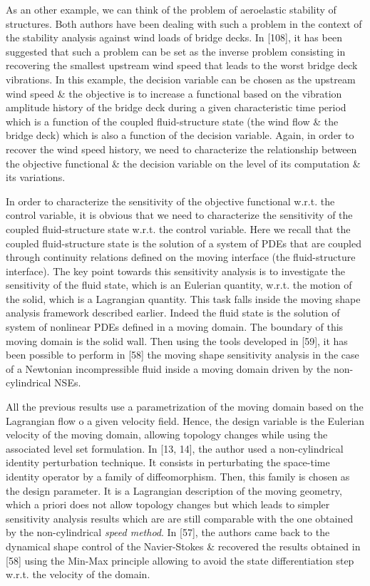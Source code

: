 \documentclass[oneside]{book}
\numberwithin{equation}{section}
\begin{document}
As an other example, we can think of the problem of aeroelastic stability of structures. Both authors have been dealing with such a problem in the context of the stability analysis against wind loads of bridge decks. In [108], it has been suggested that such a problem can be set as the inverse problem consisting in recovering the smallest upstream wind speed that leads to the worst bridge deck vibrations. In this example, the decision variable can be chosen as the upstream wind speed \& the objective is to increase a functional based on the vibration amplitude history of the bridge deck during a given characteristic time period which is a function of the coupled fluid-structure state (the wind flow \& the bridge deck) which is also a function of the decision variable. Again, in order to recover the wind speed history, we need to characterize the relationship between the objective functional \& the decision variable on the level of its computation \& its variations.

In order to characterize the sensitivity of the objective functional w.r.t. the control variable, it is obvious that we need to characterize the sensitivity of the coupled fluid-structure state w.r.t. the control variable. Here we recall that the coupled fluid-structure state is the solution of a system of PDEs that are coupled through continuity relations defined on the moving interface (the fluid-structure interface). The key point towards this sensitivity analysis is to investigate the sensitivity of the fluid state, which is an Eulerian quantity, w.r.t. the motion of the solid, which is a Lagrangian quantity. This task falls inside the moving shape analysis framework described earlier. Indeed the fluid state is the solution of system of nonlinear PDEs defined in a moving domain. The boundary of this moving domain is the solid wall. Then using the tools developed in [59], it has been possible to perform in [58] the moving shape sensitivity analysis in the case of a Newtonian incompressible fluid inside a moving domain driven by the non-cylindrical NSEs.

All the previous results use a parametrization of the moving domain based on the Lagrangian flow o a given velocity field. Hence, the design variable is the Eulerian velocity of the moving domain, allowing topology changes while using the associated level set formulation. In [13, 14], the author used a non-cylindrical identity perturbation technique. It consists in perturbating the space-time identity operator by a family of diffeomorphism. Then, this family is chosen as the design parameter. It is a Lagrangian description of the moving geometry, which a priori does not allow topology changes but which leads to simpler sensitivity analysis results which are are still comparable with the one obtained by the non-cylindrical \textit{speed method}. In [57], the authors came back to the dynamical shape control of the Navier-Stokes \& recovered the results obtained in [58] using the Min-Max principle allowing to avoid the state differentiation step w.r.t. the velocity of the domain.
\end{document}
